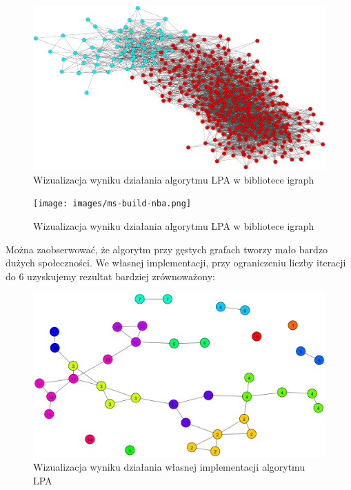 \documentclass{article}
\begin{document}
\begin{figure}[H]
\centering
\includegraphics[width=\textwidth]{images/ms-build-lpa-2.png}
\caption{Wizualizacja wyniku działania algorytmu LPA w bibliotece igraph}
\end{figure}

\begin{figure}[H]
\centering
\texttt{[image: images/ms-build-nba.png]}
\caption{Wizualizacja wyniku działania algorytmu LPA w bibliotece igraph}
\end{figure}

Można zaobserwować, że algorytm przy gęstych grafach tworzy mało bardzo dużych społeczności. We własnej implementacji, przy ograniczeniu liczby iteracji do 6 uzyskujemy rezultat bardziej zrównoważony:

\begin{figure}[H]
\centering
\includegraphics[width=\textwidth]{images/ms-lpa-0.png}
\caption{Wizualizacja wyniku działania własnej implementacji algorytmu LPA} 
\end{figure}
\end{document}
